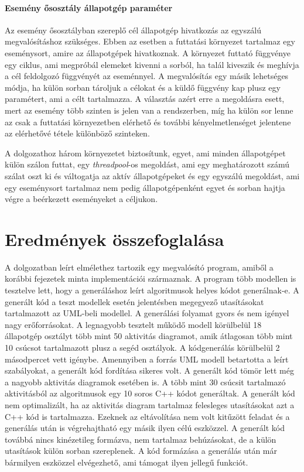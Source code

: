 \documentclass[a4paper,12pt]{report}
\begin{document}
\subsubsection{Esemény ősosztály állapotgép paraméter}
Az esemény ősosztályban szereplő cél állapotgép hivatkozás az egyszálú megvalósításhoz szükséges. Ebben az esetben a futtatási környezet tartalmaz egy eseménysort, amire az állapotgépek hivatkoznak. A környezet futtató függvénye egy ciklus, ami megpróbál elemeket kivenni a sorból, ha talál kiveszik és meghívja a cél feldolgozó függvényét az eseménnyel. A megvalósítás egy másik lehetséges módja, ha külön sorban tároljuk a célokat és a küldő függvény kap plusz egy paramétert, ami a célt tartalmazza. A választás azért erre a megoldásra esett, mert az esemény több szinten is jelen van a rendszerben, míg ha külön sor lenne az csak a futtatási környezetben elérhető és további kényelmetlenséget jelentene az elérhetővé tétele különböző szinteken. 

A dolgozathoz három környezetet biztosítunk, egyet, ami minden állapotgépet külön szálon futtat, egy {\it threadpool}-os megoldást, ami egy meghatározott számú szálat oszt ki és váltogatja az aktív állapotgépeket és egy egyszálú megoldást, ami egy eseménysort tartalmaz nem pedig állapotgépenként egyet és sorban hajtja végre a beérkezett eseményeket a céljukon.

\chapter{Eredmények összefoglalása}

A dolgozatban leírt elmélethez tartozik egy megvalósító program, amiből a korábbi fejezetek minta implementációi származnak. A program több modellen is tesztelve lett, hogy a generáláshoz leírt algoritmusok helyes kódot generálnak-e. A generált kód a teszt modellek esetén jelentésben megegyező utasításokat tartalmazott az UML-beli modellel. A generálási folyamat gyors és nem igényel nagy erőforrásokat. A legnagyobb tesztelt működő modell körülbelül 18 állapotgép osztályt több mint 50 aktivitás diagramot, amik átlagosan több mint 10 csúcsot tartalmazott plusz a segéd osztályok. A kódgenerálás körülbelül 2 másodpercet vett igénybe. Amennyiben a forrás UML modell betartotta a leírt szabályokat, a generált kód fordítása sikeres volt. A generált kód tömör lett még a nagyobb aktivitás diagramok esetében is. A több mint 30 csúcsit tartalmazó aktivitásból az algoritmusok egy 10 soros C++ kódot generáltak. A generált kód nem optimalizált, ha az aktivitás diagram tartalmaz felesleges utasításokat azt a C++ kód is tartalmazza. Ezeknek az eltávolítása nem volt kitűzött feladat és a generálás után is végrehajtható egy másik ilyen célú eszközzel. A generált kód továbbá nincs kinézetileg formázva, nem tartalmaz behúzásokat, de a külön utasítások külön sorban szereplenek. A kód formázása a generálás után már bármilyen eszközzel elvégezhető, ami támogat ilyen jellegű funkciót.
\end{document}
